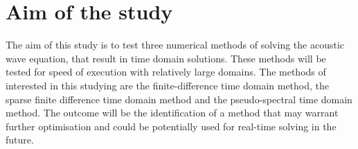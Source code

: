 \section{Aim of the study}

The aim of this study is to test three numerical methods of solving the acoustic wave equation, that result in time domain solutions. These methods will be tested for speed of execution with relatively large domains. The methods of interested in this studying are the finite-difference time domain method, the sparse finite difference time domain method and the pseudo-spectral time domain method. The outcome will be the identification of a method that may warrant further optimisation and could be potentially used for real-time solving in the future.\\



